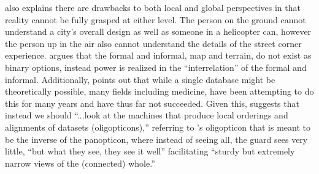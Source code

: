 \cite{Scott1998Seeing} also explains there are drawbacks to both local and global perspectives in that reality cannot be fully grasped at either level. The person on the ground cannot understand a city’s overall design as well as someone in a helicopter can, however the person up in the air also cannot understand the details of the street corner experience. \cite{Berg1997OfForms} argues that the formal and informal, map and terrain, do not exist as binary options, instead power is realized in the “interrelation” of the formal and informal. Additionally, \cite{Bowker2000Bio} points out that while a single database might be theoretically possible, many fields including medicine, have been attempting to do this for many years and have thus far not succeeded. Given this, \cite{Bowker2000Bio} suggests that instead we should “...look at the machines that produce local orderings and alignments of datasets (oligopticons),” referring to \cite{Latour2005ANT}'s oligopticon that is meant to be the inverse of the panopticon, where instead of seeing all, the guard sees very little, “but what they see, they see it well” facilitating “sturdy but extremely narrow views of the (connected) whole.”
